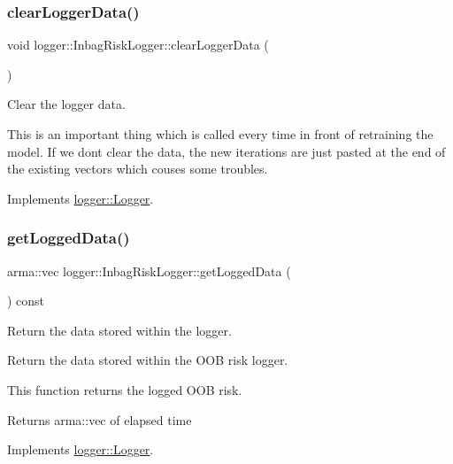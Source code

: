 \subsubsection{\texorpdfstring{clear\+Logger\+Data()}{clearLoggerData()}}
{\footnotesize\ttfamily void logger\+::\+Inbag\+Risk\+Logger\+::clear\+Logger\+Data (\begin{DoxyParamCaption}{ }\end{DoxyParamCaption})\hspace{0.3cm}{\ttfamily [virtual]}}



Clear the logger data. 

This is an important thing which is called every time in front of retraining the model. If we don\textquotesingle{}t clear the data, the new iterations are just pasted at the end of the existing vectors which couses some troubles. 

Implements \mbox{\hyperlink{classlogger_1_1_logger_a8c68db2430fa84b67528bfa6ae45a516}{logger\+::\+Logger}}.

\mbox{\label{classlogger_1_1_inbag_risk_logger_af69f22c25521341a26152692bd03183a}} 
\subsubsection{\texorpdfstring{get\+Logged\+Data()}{getLoggedData()}}
{\footnotesize\ttfamily arma\+::vec logger\+::\+Inbag\+Risk\+Logger\+::get\+Logged\+Data (\begin{DoxyParamCaption}{ }\end{DoxyParamCaption}) const\hspace{0.3cm}{\ttfamily [virtual]}}



Return the data stored within the logger. 

Return the data stored within the O\+OB risk logger.

This function returns the logged O\+OB risk.

\begin{DoxyReturn}{Returns}
{\ttfamily arma\+::vec} of elapsed time 
\end{DoxyReturn}


Implements \mbox{\hyperlink{classlogger_1_1_logger_aa4fc254c532172db3404b7c0bcd17092}{logger\+::\+Logger}}.

